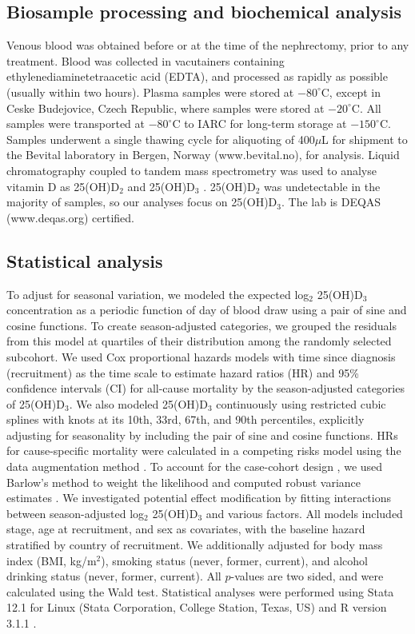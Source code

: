 \documentclass[a4paper,11pt]{article}
\renewcommand{\cite}{\citep}
\begin{document}
\subsection*{Biosample processing and biochemical analysis}
Venous blood was obtained before or at the time of the nephrectomy, prior to 
any treatment. Blood was collected in vacutainers containing 
ethylenediaminetetraacetic acid (EDTA), and processed as rapidly as possible 
(usually within two hours). Plasma samples were stored at $-80^{\circ}$C, 
except in Ceske Budejovice, Czech Republic, where samples were stored at 
$-20^{\circ}$C. All samples were transported at $-80^{\circ}$C to IARC for 
long-term storage at $-150^{\circ}$C. Samples underwent a single thawing cycle 
for aliquoting of 400$\mu$L for shipment to the Bevital laboratory in Bergen, 
Norway (www.bevital.no), for analysis. Liquid chromatography coupled to tandem 
mass spectrometry was used to analyse vitamin D as 25(OH)D$_2$ and 
25(OH)D$_3$ \cite{midttun_determination_2011}. 25(OH)D$_2$ was undetectable in 
the majority of samples, so our analyses focus on 25(OH)D$_3$. The lab is DEQAS 
(www.deqas.org) certified.

\subsection*{Statistical analysis}
To adjust for seasonal variation, we modeled the expected log$_2$ 25(OH)D$_3$ 
concentration as a periodic function of day of blood draw using a pair of sine 
and cosine functions. To create season-adjusted categories, we grouped the 
residuals from this model at quartiles of their distribution among the randomly 
selected subcohort. We used Cox proportional hazards models with time since 
diagnosis (recruitment) as the time scale to estimate hazard ratios (HR) and 
95\% confidence intervals (CI) for all-cause mortality by the season-adjusted 
categories of 25(OH)D$_3$. We also modeled 25(OH)D$_3$ continuously using 
restricted cubic splines with knots at its 10th, 33rd, 67th, and 90th 
percentiles, explicitly adjusting for seasonality by including the pair of sine 
and cosine functions. HRs for cause-specific mortality were calculated in a 
competing risks model using the data augmentation method 
\cite{lunn_applying_1995}. To account for the case-cohort design 
\cite{prentice_case-cohort_1986}, we used Barlow's method to weight the 
likelihood and computed robust variance estimates \cite{barlow_robust_1994, 
barlow_analysis_1999}. We investigated potential effect modification by fitting 
interactions between season-adjusted log$_2$ 25(OH)D$_3$ and various factors. 
All models included stage, age at recruitment, and sex as covariates, with the 
baseline hazard stratified by country of recruitment. We additionally adjusted 
for body mass index (BMI, kg/m$^2$), smoking status (never, former, current), 
and alcohol drinking status (never, former, current).
All $p$-values are two sided, and were calculated using the Wald test. 
Statistical analyses were performed using Stata 12.1 for Linux (Stata 
Corporation, College Station, Texas, US) and R version 3.1.1 \cite{r_2014}.
\end{document}

